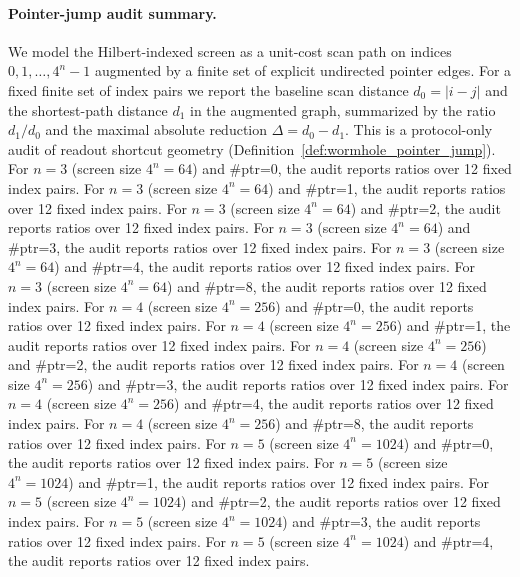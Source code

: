 \paragraph{Pointer-jump audit summary.} \AuditTag We model the Hilbert-indexed screen as a unit-cost scan path on indices $0,1,\dots,4^n-1$ augmented by a finite set of explicit undirected pointer edges. For a fixed finite set of index pairs we report the baseline scan distance $d_0=|i-j|$ and the shortest-path distance $d_1$ in the augmented graph, summarized by the ratio $d_1/d_0$ and the maximal absolute reduction $\Delta=d_0-d_1$. This is a protocol-only audit of readout shortcut geometry (Definition~\ref{def:wormhole_pointer_jump}).
\noindent\AuditTag For $n=3$ (screen size $4^n=64$) and \#ptr=0, the audit reports ratios over 12 fixed index pairs.
\noindent\AuditTag For $n=3$ (screen size $4^n=64$) and \#ptr=1, the audit reports ratios over 12 fixed index pairs.
\noindent\AuditTag For $n=3$ (screen size $4^n=64$) and \#ptr=2, the audit reports ratios over 12 fixed index pairs.
\noindent\AuditTag For $n=3$ (screen size $4^n=64$) and \#ptr=3, the audit reports ratios over 12 fixed index pairs.
\noindent\AuditTag For $n=3$ (screen size $4^n=64$) and \#ptr=4, the audit reports ratios over 12 fixed index pairs.
\noindent\AuditTag For $n=3$ (screen size $4^n=64$) and \#ptr=8, the audit reports ratios over 12 fixed index pairs.
\noindent\AuditTag For $n=4$ (screen size $4^n=256$) and \#ptr=0, the audit reports ratios over 12 fixed index pairs.
\noindent\AuditTag For $n=4$ (screen size $4^n=256$) and \#ptr=1, the audit reports ratios over 12 fixed index pairs.
\noindent\AuditTag For $n=4$ (screen size $4^n=256$) and \#ptr=2, the audit reports ratios over 12 fixed index pairs.
\noindent\AuditTag For $n=4$ (screen size $4^n=256$) and \#ptr=3, the audit reports ratios over 12 fixed index pairs.
\noindent\AuditTag For $n=4$ (screen size $4^n=256$) and \#ptr=4, the audit reports ratios over 12 fixed index pairs.
\noindent\AuditTag For $n=4$ (screen size $4^n=256$) and \#ptr=8, the audit reports ratios over 12 fixed index pairs.
\noindent\AuditTag For $n=5$ (screen size $4^n=1024$) and \#ptr=0, the audit reports ratios over 12 fixed index pairs.
\noindent\AuditTag For $n=5$ (screen size $4^n=1024$) and \#ptr=1, the audit reports ratios over 12 fixed index pairs.
\noindent\AuditTag For $n=5$ (screen size $4^n=1024$) and \#ptr=2, the audit reports ratios over 12 fixed index pairs.
\noindent\AuditTag For $n=5$ (screen size $4^n=1024$) and \#ptr=3, the audit reports ratios over 12 fixed index pairs.
\noindent\AuditTag For $n=5$ (screen size $4^n=1024$) and \#ptr=4, the audit reports ratios over 12 fixed index pairs.
